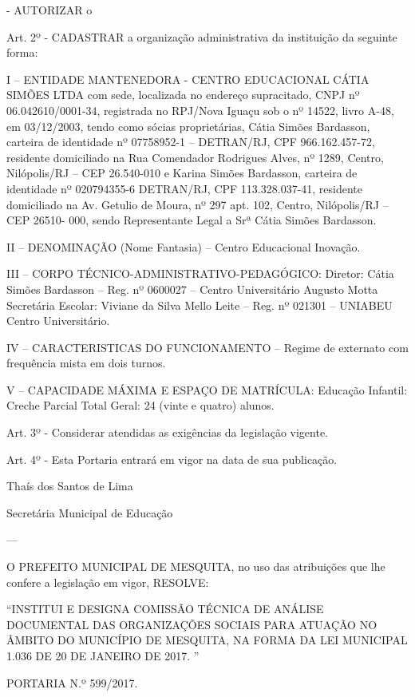 \documentclass{doliberto}
\begin{document}
-  AUTORIZAR  o 
 
Art.  2º  -  CADASTRAR  a  organização  administrativa  da 
instituição da seguinte forma: 
 
I – ENTIDADE MANTENEDORA  -  CENTRO EDUCACIONAL 
CÁTIA  SIMÕES  LTDA  com  sede,  localizada  no  endereço 
supracitado,  CNPJ  nº  06.042610/0001-34,  registrada  no 
RPJ/Nova  Iguaçu  sob  o  nº  14522, 
livro  A-48,  em 
03/12/2003, tendo como sócias proprietárias, Cátia Simões 
Bardasson,  carteira  de 
identidade  nº  07758952-1  – 
DETRAN/RJ, CPF 966.162.457-72, residente domiciliado na 
Rua  Comendador  Rodrigues  Alves,  nº  1289,  Centro, 
Nilópolis/RJ – CEP 26.540-010 e Karina Simões Bardasson, 
carteira  de  identidade  nº  020794355-6  DETRAN/RJ,  CPF 
113.328.037-41,  residente  domiciliado  na  Av.  Getulio  de 
Moura, nº 297 apt. 102, Centro, Nilópolis/RJ  – CEP 26510-
000,  sendo  Representante  Legal  a  Srª  Cátia  Simões 
Bardasson. 
 
II – DENOMINAÇÃO (Nome Fantasia) – Centro Educacional 
Inovação. 
 
III – CORPO TÉCNICO-ADMINISTRATIVO-PEDAGÓGICO: 
Diretor: Cátia Simões Bardasson – Reg. nº 0600027 – Centro 
Universitário Augusto Motta  
Secretária  Escolar:  Viviane  da  Silva  Mello  Leite  –  Reg.  nº 
021301 – UNIABEU Centro Universitário. 
 
IV  –  CARACTERISTICAS  DO  FUNCIONAMENTO  –  Regime 
de externato com frequência mista em dois turnos. 
 
V – CAPACIDADE MÁXIMA E ESPAÇO DE MATRÍCULA: 
Educação Infantil: Creche Parcial 
Total Geral: 24 (vinte e quatro) alunos. 
 
Art.  3º  -  Considerar  atendidas  as  exigências  da  legislação 
vigente. 
 
Art.  4º  -  Esta  Portaria  entrará  em  vigor  na  data  de  sua 
publicação. 
 
Thaís dos Santos de Lima 

Secretária Municipal de Educação 

---

O PREFEITO MUNICIPAL DE MESQUITA, no uso 
das  atribuições  que  lhe  confere  a  legislação  em 
vigor, RESOLVE: 
 
“INSTITUI  E  DESIGNA  COMISSÃO  TÉCNICA  DE  ANÁLISE 
DOCUMENTAL DAS ORGANIZAÇÕES SOCIAIS PARA ATUAÇÃO 
NO ÂMBITO DO MUNICÍPIO DE MESQUITA, NA FORMA DA LEI 
MUNICIPAL 1.036 DE 20 DE JANEIRO DE 2017. ” 
 
PORTARIA N.º 599/2017. 
 
\end{document}
